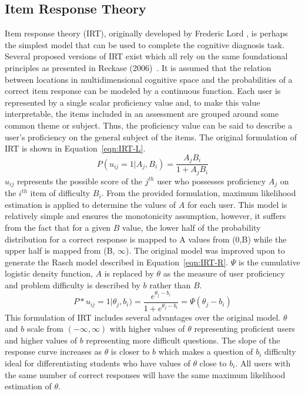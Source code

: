 \documentclass[letterpaper, 12pt, captions=tableabove]{scrreprt}
\begin{document}
		\subsection{Item Response Theory}
		\label{sub:IRT}
			Item response theory (IRT), originally developed by Frederic Lord \cite{lord1952}, is perhaps the simplest model that can be used to complete the cognitive diagnosis task. Several proposed versions of IRT exist which all rely on the same foundational principles as presented in Reckase (2006)~\cite{reckase2006}. It is assumed that the relation between locations in multidimensional cognitive space and the probabilities of a correct item response can be modeled by a continuous function. Each user is represented by a single scalar proficiency value and, to make this value interpretable, the items included in an assessment are grouped around some common theme or subject. Thus, the proficiency value can be said to describe a user's proficiency on the general subject of the items. The original formulation of IRT is shown in Equation~\ref{eqn:IRT-L}.
			\begin{equation}
				\label{eqn:IRT-L}
				P(u_{ij} = 1 | A_j, B_i) = \frac{A_jB_i}{1 +A_jB_i}
			\end{equation}
			$u_{ij}$ represents the possible score of the $j^{th}$ user who possesses proficiency $A_j$ on the $i^{th}$ item of difficulty $B_i$. From the provided formulation, maximum likelihood estimation is applied to determine the values of $A$ for each user. This model is relatively simple and ensures the monotonicity assumption, however, it suffers from the fact that for a given $B$ value, the lower half of the probability distribution for a correct response is mapped to A values from (0,B) while the upper half is mapped from (B, $\infty$). The original model was improved upon to generate the Rasch model described in Equation~\ref{eqn:IRT-R}. $\Psi$ is the cumulative logistic density function, $A$ is replaced by $\theta$ as the measure of user proficiency and problem difficulty is described by $b$ rather than $B$.
			\begin{equation}
				\label{eqn:IRT-R}
				P*u_{ij} = 1 | \theta_j, b_i) = \frac{e^{\theta_j-b_i}}{1+e^{\theta_j-b_i}} = \Psi(\theta_j-b_i)
			\end{equation}
			This formulation of IRT includes several advantages over the original model. $\theta$ and $b$ scale from $(-\infty, \infty)$ with higher values of $\theta$ representing proficient users and higher values of $b$ representing more difficult questions. The slope of the response curve increases as $\theta$ is closer to $b$ which makes a question of $b_i$ difficulty ideal for differentiating students who have values of $\theta$ close to $b_i$. All users with the same number of correct responses will have the same maximum likelihood estimation of $\theta$.
\end{document}

